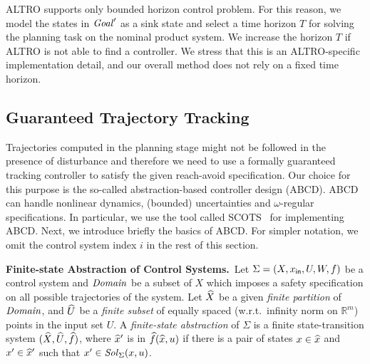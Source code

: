 \begin{remark}
	ALTRO supports only bounded horizon control problem.
	For this reason, we model the states in $\mathit{Goal}'$ as a sink state and select a time horizon $T$ for solving the planning task on the nominal product system. We increase the horizon $T$ if ALTRO is not able to find a controller.
	We stress that this is an ALTRO-specific implementation detail, and our overall method does not rely on a fixed time horizon.
\end{remark}



\subsection{Guaranteed Trajectory Tracking} 

Trajectories computed in the planning stage might not be followed in the presence of disturbance and therefore we need to use a 
formally guaranteed tracking controller to satisfy the given reach-avoid specification. 
Our choice for this purpose is the so-called abstraction-based controller design (ABCD). 
ABCD can handle nonlinear dynamics, (bounded) uncertainties and $\omega$-regular specifications. In particular, we use the tool called SCOTS~\cite{Rungger2016scots} 
for implementing ABCD. Next, we introduce briefly the basics of ABCD.
For simpler notation, we omit the control system index $i$ in the rest of this section.


\smallskip
\noindent\textbf{Finite-state Abstraction of Control Systems.}\
Let $\Sigma = (X,x_{\mathsf{in}}, U, W, f)$ be a control system and $\mathit{Domain}$ be a subset of $X$ which imposes a safety specification on all possible trajectories of the system. Let $\widehat{X}$ be a given \emph{finite partition} of $\mathit{Domain}$, and $\widehat{U}$ be a \emph{finite subset} of equally spaced (w.r.t.\ infinity norm on $\mathbb{R}^m$) points in the input set $U$.
A \emph{finite-state abstraction} of $\Sigma$ is a finite state-transition system $(\widehat{X},\widehat{U},\widehat{f})$, where $\widehat{x}'$ is in $\widehat{f}(\widehat{x},u)$ if there is a pair of states $x\in \widehat{x}$ and $x'\in \widehat{x}'$ such that $x'\in \mathit{Sol}_\Sigma(x,u)$.


